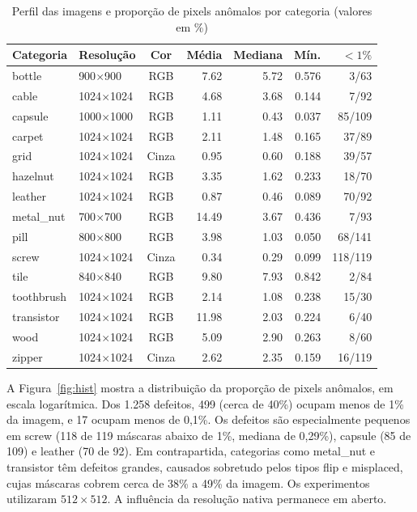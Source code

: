 \documentclass[conference]{IEEEtran}
\begin{document}
\begin{table}[htbp]
\caption{Perfil das imagens e proporção de pixels anômalos por categoria (valores em \%)}
\label{tab:perfil}
\centering
\footnotesize
\setlength{\tabcolsep}{3pt}
\begin{tabular}{llcrrrr}
\toprule
Categoria & Resolução & Cor & Média & Mediana & Mín. & $<1\%$ \\
\midrule
bottle & 900$\times$900 & RGB & 7.62 & 5.72 & 0.576 & 3/63 \\
cable & 1024$\times$1024 & RGB & 4.68 & 3.68 & 0.144 & 7/92 \\
capsule & 1000$\times$1000 & RGB & 1.11 & 0.43 & 0.037 & 85/109 \\
carpet & 1024$\times$1024 & RGB & 2.11 & 1.48 & 0.165 & 37/89 \\
grid & 1024$\times$1024 & Cinza & 0.95 & 0.60 & 0.188 & 39/57 \\
hazelnut & 1024$\times$1024 & RGB & 3.35 & 1.62 & 0.233 & 18/70 \\
leather & 1024$\times$1024 & RGB & 0.87 & 0.46 & 0.089 & 70/92 \\
metal\_nut & 700$\times$700 & RGB & 14.49 & 3.67 & 0.436 & 7/93 \\
pill & 800$\times$800 & RGB & 3.98 & 1.03 & 0.050 & 68/141 \\
screw & 1024$\times$1024 & Cinza & 0.34 & 0.29 & 0.099 & 118/119 \\
tile & 840$\times$840 & RGB & 9.80 & 7.93 & 0.842 & 2/84 \\
toothbrush & 1024$\times$1024 & RGB & 2.14 & 1.08 & 0.238 & 15/30 \\
transistor & 1024$\times$1024 & RGB & 11.98 & 2.03 & 0.224 & 6/40 \\
wood & 1024$\times$1024 & RGB & 5.09 & 2.90 & 0.263 & 8/60 \\
zipper & 1024$\times$1024 & Cinza & 2.62 & 2.35 & 0.159 & 16/119 \\
\bottomrule
\end{tabular}
\end{table}

A Figura~\ref{fig:hist} mostra a distribuição da proporção de pixels anômalos, em escala logarítmica. Dos 1.258 defeitos, 499 (cerca de 40\%) ocupam menos de 1\% da imagem, e 17 ocupam menos de 0,1\%. Os defeitos são especialmente pequenos em screw (118 de 119 máscaras abaixo de 1\%, mediana de 0,29\%), capsule (85 de 109) e leather (70 de 92). Em contrapartida, categorias como metal\_nut e transistor têm defeitos grandes, causados sobretudo pelos tipos flip e misplaced, cujas máscaras cobrem cerca de 38\% a 49\% da imagem. Os experimentos utilizaram $512\times512$. A influência da resolução nativa permanece em aberto.
\end{document}
